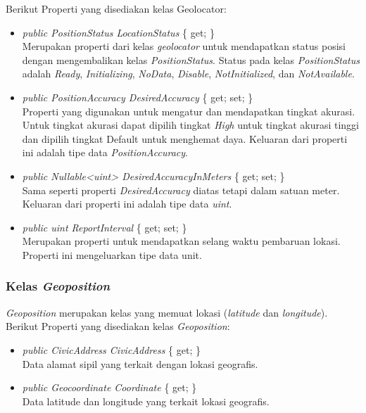 Berikut Properti yang disediakan kelas Geolocator:
\begin{itemize}
	\item \textit{public PositionStatus LocationStatus} \{ get; \} \\
		Merupakan properti dari kelas \textit{geolocator} untuk mendapatkan status posisi dengan mengembalikan kelas \textit{PositionStatus}. Status pada kelas \textit{PositionStatus} adalah \textit{Ready}, \textit{Initializing}, \textit{NoData}, \textit{Disable}, \textit{NotInitialized}, dan \textit{NotAvailable}.
	\item \textit{public PositionAccuracy DesiredAccuracy} \{ get; set; \} \\
		Properti yang digunakan untuk mengatur dan mendapatkan tingkat akurasi. Untuk tingkat akurasi dapat dipilih tingkat \textit{High} untuk tingkat akurasi tinggi dan dipilih tingkat {Default} untuk menghemat daya. Keluaran dari properti ini adalah tipe data \textit{PositionAccuracy}.
	\item \textit{public Nullable<uint> DesiredAccuracyInMeters} \{ get; set; \}\\
		Sama seperti properti \textit{DesiredAccuracy} diatas tetapi dalam satuan meter. Keluaran dari properti ini adalah tipe data \textit{uint}.
	\item \textit{public uint ReportInterval} \{ get; set; \} \\
		Merupakan properti untuk mendapatkan selang waktu pembaruan lokasi. Properti ini mengeluarkan tipe data unit.
\end{itemize}

\subsubsection{Kelas \textit{Geoposition}}
\label{subsubsec:Kelas Geoposition}
\hspace{0.5cm} \textit{Geoposition} merupakan kelas yang memuat lokasi (\textit{latitude} dan \textit{longitude}).
Berikut Properti yang disediakan kelas \textit{Geoposition}:
\begin{itemize}
	\item \textit{public CivicAddress CivicAddress} \{ get; \} \\
		Data alamat sipil yang terkait dengan lokasi geografis.
	\item \textit{public Geocoordinate Coordinate} \{ get; \} \\
		Data latitude dan longitude yang terkait lokasi geografis.
\end{itemize}

